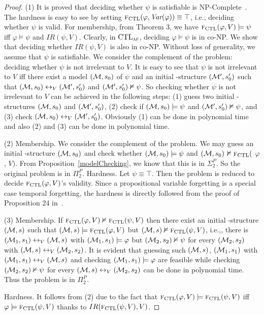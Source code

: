 \documentclass[letterpaper]{article} %
\begin{document}
\begin{proof}
(1) It is proved that deciding whether $\psi$ is satisfiable is NP-Complete~\cite{DBLP:journals/ijfcs/MeierTVM15}. The hardness is easy to see by setting ${\textsc{f}_{\textrm{CTL}}}(\varphi, \textit{Var}(\varphi))\equiv \top$, i.e., deciding whether $\psi$ is valid.
For membership, from Theorem
3, we have ${\textsc{f}_{\textrm{CTL}}}(\varphi, V ) \models \psi$ iff $\varphi \models \psi$ and $IR(\psi, V )$.
Clearly, in $\textrm{CTL}_{\textsc{a} \textsc{f}}$, deciding $\varphi\models \psi$ is in co-NP. We show that deciding whether $IR(\psi, V )$ is also
in co-NP. Without loss of generality, we assume that $\psi$ is satisfiable.
 We consider the complement of the problem: deciding whether $\psi$ is not irrelevant to $V$. It is easy to see that $\psi$ is
not irrelevant to $V$ iff there exist a model $({\cal M}, s_0)$ of $\psi$ and an
initial \MPK-structure $({\cal M}',s_0')$  such that
$({\cal M}, s_0) \leftrightarrow_V ({\cal M}',s_0')$ and $({\cal M}',s_0')\nvDash \psi$. So checking whether $\psi$ is not irrelevant to $V$ can be achieved in the following steps: (1) guess two initial \MPK-structures $({\cal M},s_0)$ and $({\cal M}',s_0')$, (2) check if $({\cal M},s_0) \models \psi$ and $({\cal M}',s_0')\nvDash \psi$, and (3) check
$({\cal M}, s_0) \leftrightarrow_V ({\cal M}',s_0')$. Obviously (1) can be done in polynomial time and also (2) and (3) can be done in polynomial time.

(2) Membership. We consider the complement of the
problem. We may guess an initial \MPK-structure $({\cal M}, s_0)$ and check whether $({\cal M},s_0) \models \psi$ and $({\cal M},s_0)$ $\nvDash {\textsc{f}_{\textrm{CTL}}}($ $\varphi$, $V)$. From Proposition~\ref{modelChecking}, we know that this is in $\Sigma_2^P$. So the original problem is in $\Pi_2^P$. Hardness. Let $\psi \equiv \top$. Then the problem is reduced to decide ${\textsc{f}_{\textrm{CTL}}}(\varphi, V )$'s validity. Since a propositional variable forgetting is a special case temporal forgetting, the hardness is directly followed from the proof of Proposition 24 in~\cite{DBLP:journals/jair/LangLM03}.

(3) Membership. If ${\textsc{f}_{\textrm{CTL}}}(\varphi, V) \nvDash {\textsc{f}_{\textrm{CTL}}}(\psi, V)$ then there exist an initial \MPK-structure $({\cal M}, s)$ such that $({\cal M}, s)\models {\textsc{f}_{\textrm{CTL}}}(\varphi, V)$ but $({\cal M}, s) \nvDash {\textsc{f}_{\textrm{CTL}}}(\psi, V)$, i.e.,, there is $({\cal M}_1, s_1) \leftrightarrow_V ({\cal M}, s)$ with $({\cal M}_1, s_1) \models \varphi$ but $({\cal M}_2, s_2) \nvDash \psi$ for every $({\cal M}_2, s_2)$ with $({\cal M}, s) \leftrightarrow_V ({\cal M}_2, s_2)$. It is evident that guessing such $({\cal M}, s)$, $({\cal M}_1, s_1)$ with $({\cal M}_1, s_1) \leftrightarrow_V ({\cal M}, s)$ and checking $({\cal M}_1, s_1)\models \varphi$ are feasible while checking $({\cal M}_2, s_2) \nvDash \psi$ for every $({\cal M}, s) \leftrightarrow_V ({\cal M}_2, s_2)$ can be done in polynomial time. Thus the problem is in $\Pi_2^P$.

Hardness. It follows from (2) due to the fact that ${\textsc{f}_{\textrm{CTL}}}(\varphi, V) \models {\textsc{f}_{\textrm{CTL}}}(\psi, V)$ iff $\varphi \models {\textsc{f}_{\textrm{CTL}}}(\psi, V)$ thanks to $IR({\textsc{f}_{\textrm{CTL}}}(\psi, V), V)$.

\end{proof}
\end{document}
